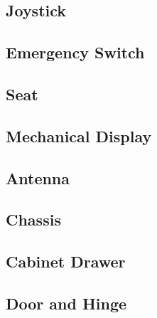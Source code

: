 \newcommand{\WorkingDrawing}[2]{
\begin{figure}[!ht]
    \centering
    \texttt{[image: \#1]}
    \caption{#2}
\end{figure}
}

\subsection{Joystick} \label{sec:WorkingDrawingJoystick}

\clearpage
\subsection{Emergency Switch} \label{sec:WorkingDrawingEmergencySwitch}

\clearpage
\subsection{Seat} \label{sec:WorkingDrawingSeat}

\clearpage
\subsection{Mechanical Display} \label{sec:WorkingDrawingMechanicalDisplay}

\clearpage
\subsection{Antenna} \label{sec:WorkingDrawingAntenna}

\clearpage
\subsection{Chassis} \label{sec:WorkingDrawingChassis}

\clearpage
\subsection{Cabinet Drawer} \label{sec:WorkingDrawingCabinetDrawer}

\clearpage
\subsection{Door and Hinge} \label{sec:WorkingDrawingDoorAndHinge}

\clearpage
